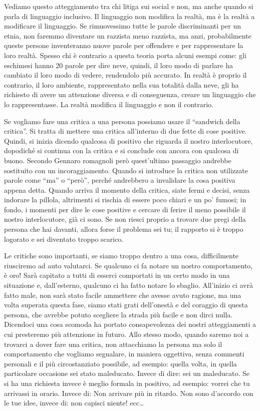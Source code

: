 \documentclass[12pt]{book} %
\begin{document}
Vediamo questo atteggiamento tra chi litiga sui social e non, ma anche quando si parla di linguaggio inclusivo. Il
linguaggio non modifica la realtà, ma è la realtà a modificare il linguaggio. Se rimuovessimo tutte le parole
discriminanti per un etnia, non faremmo diventare un razzista meno razzista, ma anzi, probabilmente queste persone
inventeranno nuove parole per offendere e per rappresentare la loro realtà.
Spesso chi è contrario a questa teoria porta alcuni esempi come: gli eschimesi hanno 20 parole per dire neve, quindi, il loro modo di parlare ha cambiato il loro modo di vedere, rendendolo più accurato. In realtà è proprio il contrario, il loro ambiente, rappresentato nella sua totalità dalla neve, gli ha richiesto di avere un attenzione diversa e di conseguenza, creare un linguaggio che lo rappresentasse. La realtà modifica il linguaggio e non il contrario.

Se vogliamo fare una critica a una persona possiamo usare il “sandwich della critica”. Si tratta di mettere una critica
all'interno di due fette di cose positive. Quindi, si inizia dicendo qualcosa di positivo che
riguarda il nostro interlocutore, dopodiché si continua con la critica e si conclude con ancora con qualcosa di buono.
Secondo Gennaro romagnoli però quest'ultimo passaggio andrebbe sostituito con un incoraggiamento. 
Quando si introduce la critica non utilizzate parole come “ma” o “però”, perché andrebbero a invalidare la cosa
positiva appena detta. Quando arriva il momento della critica, siate fermi e decisi, senza indorare la pillola,
altrimenti si rischia di essere poco chiari e un po' fumosi; in fondo, i momenti per dire le cose
positive e cercare di ferire il meno possibile il nostro interlocutore, già ci sono. Se non riesci proprio a trovare
due pregi della persona che hai davanti, allora forse il problema sei tu; il rapporto si è troppo logorato e sei
diventato troppo scarico.

\bigskip

Le critiche sono importanti, se siamo troppo dentro a una cosa, difficilmente riusciremo ad auto valutarci. 
Se qualcuno ci fa notare un nostro comportamento, è oro! Sarà capitato a tutti di esserci comportati
in un certo modo in una situazione e, dall'esterno, qualcuno ci ha fatto notare lo sbaglio.
All'inizio ci avrà fatto male, non sarà stato facile ammettere che avesse avuto ragione, ma una
volta superata questa fase, siamo stati grati dell'onestà e del coraggio di questa persona, che avrebbe potuto scegliere la strada più facile e non dirci nulla.
Dicendoci una cosa scomoda ha portato consapevolezza dei nostri atteggiamenti a cui presteremo più attenzione in
futuro. Allo stesso modo, quando saremo noi a trovarci a dover fare una critica, non attacchiamo la persona ma solo il
comportamento che vogliamo segnalare, in maniera oggettiva, senza commenti personali e il più circostanziato possibile,
ad esempio: quella volta, in quella particolare occasione sei stato maleducato. Invece di dire: sei un maleducato. Se
si ha una richiesta invece è meglio formala in positivo, ad esempio: vorrei che tu arrivassi in orario. Invece di: Non
arrivare più in ritardo. Non sono d'accordo con le tue idee, invece di: non capisci niente! ecc…
\end{document}
